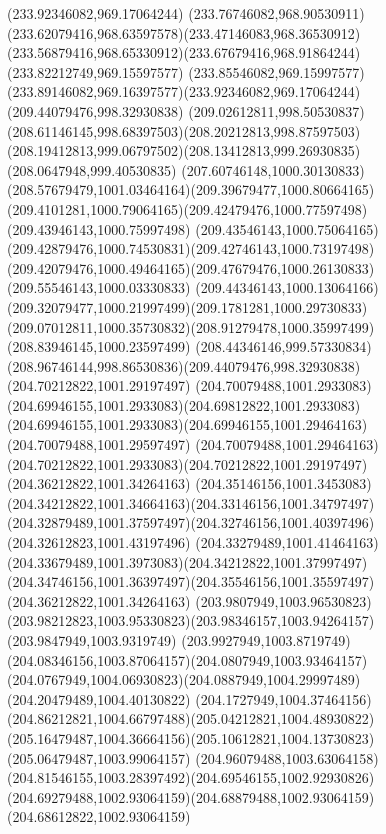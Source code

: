 {{		\moveto(233.92346082,969.17064244)
		\curveto(233.76746082,968.90530911)(233.62079416,968.63597578)(233.47146083,968.36530912)
		\curveto(233.56879416,968.65330912)(233.67679416,968.91864244)(233.82212749,969.15597577)
		\curveto(233.85546082,969.15997577)(233.89146082,969.16397577)(233.92346082,969.17064244)
		\moveto(209.44079476,998.32930838)
		\curveto(209.02612811,998.50530837)(208.61146145,998.68397503)(208.20212813,998.87597503)
		\curveto(208.19412813,999.06797502)(208.13412813,999.26930835)(208.0647948,999.40530835)
		\curveto(207.60746148,1000.30130833)(208.57679479,1001.03464164)(209.39679477,1000.80664165)
		\curveto(209.4101281,1000.79064165)(209.42479476,1000.77597498)(209.43946143,1000.75997498)
		\curveto(209.43546143,1000.75064165)(209.42879476,1000.74530831)(209.42746143,1000.73197498)
		\curveto(209.42079476,1000.49464165)(209.47679476,1000.26130833)(209.55546143,1000.03330833)
		\curveto(209.44346143,1000.13064166)(209.32079477,1000.21997499)(209.1781281,1000.29730833)
		\curveto(209.07012811,1000.35730832)(208.91279478,1000.35997499)(208.83946145,1000.23597499)
		\curveto(208.44346146,999.57330834)(208.96746144,998.86530836)(209.44079476,998.32930838)
		\moveto(204.70212822,1001.29197497)
		\curveto(204.70079488,1001.2933083)(204.69946155,1001.2933083)(204.69812822,1001.2933083)
		\curveto(204.69946155,1001.2933083)(204.69946155,1001.29464163)(204.70079488,1001.29597497)
		\curveto(204.70079488,1001.29464163)(204.70212822,1001.2933083)(204.70212822,1001.29197497)
		\moveto(204.36212822,1001.34264163)
		\curveto(204.35146156,1001.3453083)(204.34212822,1001.34664163)(204.33146156,1001.34797497)
		\curveto(204.32879489,1001.37597497)(204.32746156,1001.40397496)(204.32612823,1001.43197496)
		\curveto(204.33279489,1001.41464163)(204.33679489,1001.3973083)(204.34212822,1001.37997497)
		\curveto(204.34746156,1001.36397497)(204.35546156,1001.35597497)(204.36212822,1001.34264163)
		\moveto(203.9807949,1003.96530823)
		\curveto(203.98212823,1003.95330823)(203.98346157,1003.94264157)(203.9847949,1003.9319749)
		\curveto(203.9927949,1003.8719749)(204.08346156,1003.87064157)(204.0807949,1003.93464157)
		\curveto(204.0767949,1004.06930823)(204.0887949,1004.29997489)(204.20479489,1004.40130822)
		\curveto(204.1727949,1004.37464156)(204.86212821,1004.66797488)(205.04212821,1004.48930822)
		\curveto(205.16479487,1004.36664156)(205.10612821,1004.13730823)(205.06479487,1003.99064157)
		\curveto(204.96079488,1003.63064158)(204.81546155,1003.28397492)(204.69546155,1002.92930826)
		\curveto(204.69279488,1002.93064159)(204.68879488,1002.93064159)(204.68612822,1002.93064159)
}}
